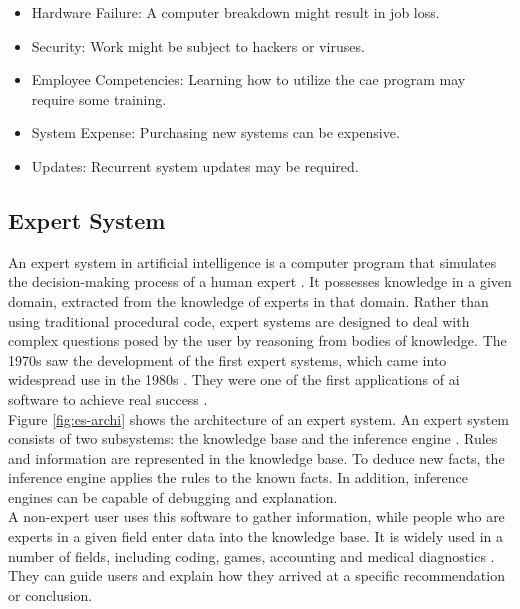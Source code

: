     \begin{itemize}
        \item Hardware Failure: A computer breakdown might result in job loss.
        \item Security: Work might be subject to hackers or viruses.
        \item Employee Competencies: Learning how to utilize the \acrshort{cae} program may require some training.
        \item System Expense: Purchasing new systems can be expensive.
        \item Updates: Recurrent system updates may be required.
    \end{itemize}

\subsection{Expert System\label{subsec:exp-sys}}
An expert system in artificial intelligence is a computer program that simulates the decision-making process of a human expert \cite{liao2005expert, waterman1985guide}. It possesses knowledge in a given domain, extracted from the knowledge of experts in that domain.  Rather than using traditional procedural code, expert systems are designed to deal with complex questions posed by the user by reasoning from bodies of knowledge. The 1970s saw the development of the first expert systems, which came into widespread use in the 1980s \cite{buchanan1988fundamentals}. They were one of the first applications of \acrfull{ai} software to achieve real success \cite{buckley1986fuzzy, buchanan1988fundamentals, waterman1985guide}. \\

Figure \ref{fig:es-archi} shows the architecture of an expert system. An expert system consists of two subsystems: the knowledge base and the inference engine \cite{tripathi2011review}. Rules and information are represented in the knowledge base. To deduce new facts, the inference engine applies the rules to the known facts. In addition, inference engines can be capable of debugging and explanation.\\

A non-expert user uses this software to gather information, while people who are experts in a given field enter data into the knowledge base. It is widely used in a number of fields, including coding, games, accounting and medical diagnostics \cite{liao2005expert}. They can guide users and explain how they arrived at a specific recommendation or conclusion.\\

